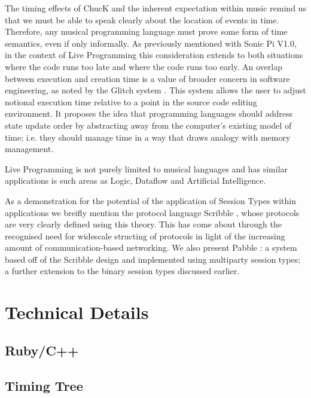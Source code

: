 \documentclass[11pt]{scrartcl}
\begin{document}
The timing effects of ChucK and the inherent expectation within music remind 
us that we must be able to speak clearly about the location of events in time. 
Therefore, any musical programming language must prove some form of time 
semantics, even if only informally. As previously mentioned with Sonic Pi 
V1.0, in the context of Live Programming this consideration extends to both 
situations where the code runs too late and where the code runs too early. An 
overlap between execution and creation time is a value of broader concern in 
software engineering, as noted by the Glitch system \cite{ME14}. This system 
allows the user to adjust notional execution time relative to a point in the 
source code editing environment. It proposes the idea that programming 
languages should address state update order by abstracting away from the 
computer's existing model of time; i.e. they should manage time in a way that 
draws analogy with memory management. 

Live Programming is not purely limited to musical languages and has similar 
applications is such areas as Logic, Dataflow and Artificial Intelligence.

As a demonstration for the potential of the application of Session Types 
within applications we breifly mention the protocol language Scribble 
\cite{HMBCY11}, whose protocols are very clearly defined using this theory. 
This has come about through the recognised need for widescale structing of 
protocols in light of the increasing amount of communication-based networking. 
We also present Pabble \cite{NY14}: a system based off of the Scribble design 
and implemented using multiparty session types; a further extension to the 
binary session types discussed earlier.
\newpage

\section{Technical Details}
\subsection{Ruby/C++}


\subsection{Timing Tree}

\end{document}
